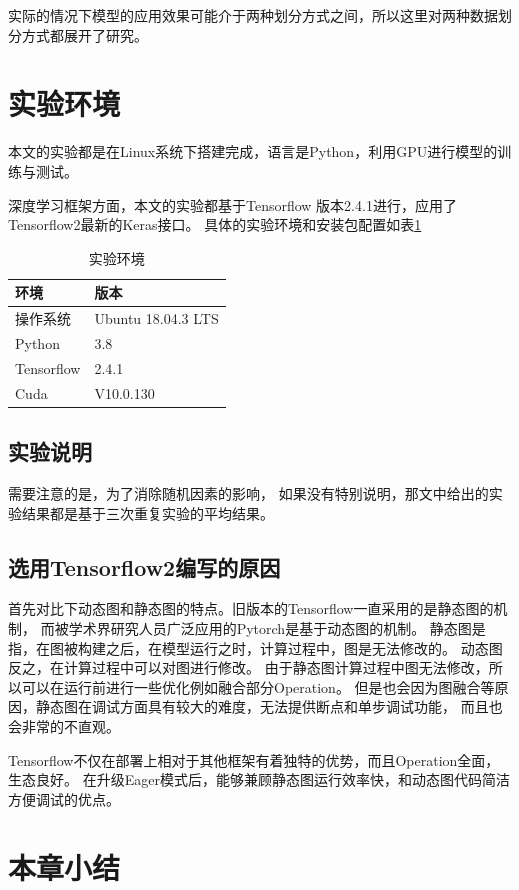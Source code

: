     实际的情况下模型的应用效果可能介于两种划分方式之间，所以这里对两种数据划分方式都展开了研究。
\section{实验环境}
    本文的实验都是在Linux系统下搭建完成，语言是Python，利用GPU进行模型的训练与测试。
  
    深度学习框架方面，本文的实验都基于Tensorflow 版本2.4.1进行，应用了Tensorflow2最新的Keras接口。
    具体的实验环境和安装包配置如表\ref{tab:env}
    \begin{table}
        \centering
        \caption{实验环境}
        \begin{tabular}{ll}
          \toprule
          环境        & 版本                                        \\
          \midrule
          操作系统        & Ubuntu 18.04.3 LTS                          \\
          Python      & 3.8                                         \\
          Tensorflow  & 2.4.1                                       \\
          Cuda        & V10.0.130      \\
  
          \bottomrule
        \end{tabular}
        \label{tab:env}
    \end{table}
    \subsection{实验说明}
    需要注意的是，为了消除随机因素的影响，
    如果没有特别说明，那文中给出的实验结果都是基于三次重复实验的平均结果。
    \subsection{选用Tensorflow2编写的原因}
    首先对比下动态图和静态图的特点。旧版本的Tensorflow一直采用的是静态图的机制，
    而被学术界研究人员广泛应用的Pytorch是基于动态图的机制。
    静态图是指，在图被构建之后，在模型运行之时，计算过程中，图是无法修改的。
    动态图反之，在计算过程中可以对图进行修改。
    由于静态图计算过程中图无法修改，所以可以在运行前进行一些优化例如融合部分Operation。
    但是也会因为图融合等原因，静态图在调试方面具有较大的难度，无法提供断点和单步调试功能，
    而且也会非常的不直观。
  
    Tensorflow不仅在部署上相对于其他框架有着独特的优势，而且Operation全面，生态良好。
    在升级Eager模式后，能够兼顾静态图运行效率快，和动态图代码简洁方便调试的优点。
  

\section{本章小结}


